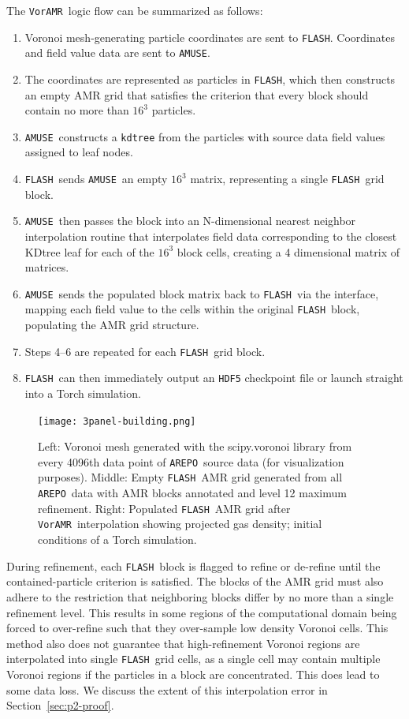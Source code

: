 \documentclass[twoside]{drexel-thesis}
\newcommand\voramr{\texttt{VorAMR}}
\newcommand\flash{\texttt{FLASH}}
\newcommand\amuse{\texttt{AMUSE}}
\newcommand\arepo{\texttt{AREPO}}
\begin{document}
\begin{thesis}
The \voramr~logic flow can be summarized as follows:
\begin{enumerate}
    \item Voronoi mesh-generating particle coordinates are sent to \flash. Coordinates and field value data are sent to \amuse.
    \item The coordinates are represented as particles in \flash, which then constructs an empty AMR grid that satisfies the criterion that every block should contain no more than $16^3$ particles. 
    \item \amuse~constructs a \texttt{kdtree} from the particles with source data field values assigned to leaf nodes.
    \item \flash~sends \amuse~an empty $16^3$ matrix, representing a single \flash~grid block.
    \item \amuse~then passes the block into an N-dimensional nearest neighbor interpolation routine that interpolates field data corresponding to the closest KDtree leaf for each of the $16^3$ block cells, creating a 4 dimensional matrix of matrices.
    \item \amuse~sends the populated block matrix back to \flash~via the interface, mapping each field value to the cells within the original \flash~block, populating the AMR grid structure.
    \item Steps 4--6 are repeated for each \flash~grid block.
    \item \flash~can then immediately output an \texttt{HDF5} checkpoint file or launch straight into a Torch simulation.
\end{enumerate}

\begin{figure}[!htb]
    \centering
    \texttt{[image: 3panel-building.png]}
    \caption{Left: Voronoi mesh generated with the scipy.voronoi library from every 4096th data point of \arepo~source data (for visualization purposes). Middle:  Empty \flash~AMR grid generated from all \arepo~data with AMR blocks annotated and level 12 maximum refinement. Right: Populated \flash~AMR grid after \voramr~interpolation showing projected gas density; initial conditions of a Torch simulation.}
    \label{fig:building}
\end{figure}

During refinement, each \flash~block is flagged to refine or de-refine until the contained-particle criterion is satisfied. The blocks of the AMR grid must also adhere to the restriction that neighboring blocks differ by no more than a single refinement level. This results in some regions of the computational domain being forced to over-refine such that they over-sample low density Voronoi cells. This method also does not guarantee that high-refinement Voronoi regions are interpolated into single \flash~grid cells, as a single cell may contain multiple Voronoi regions if the particles in a block are concentrated. This does lead to some data loss. We discuss the extent of this interpolation error in Section~\ref{sec:p2-proof}.


\end{thesis}
\end{document}
